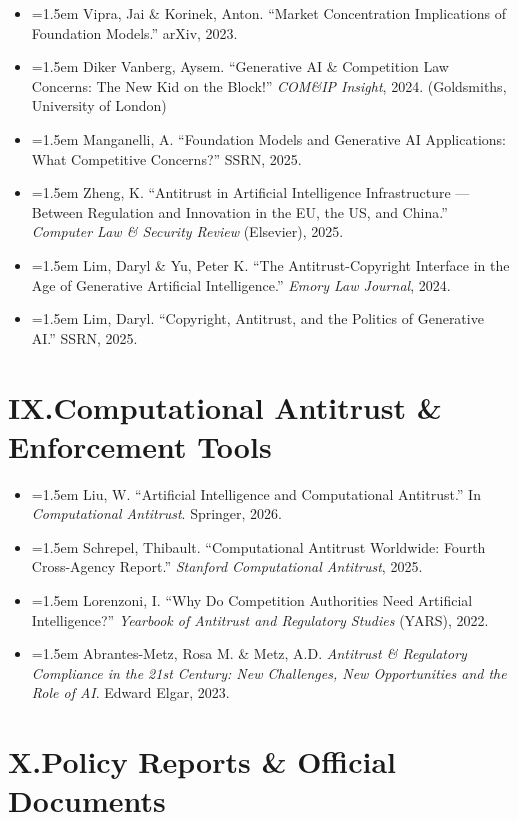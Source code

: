 \documentclass[12pt, letterpaper]{article}
\newcommand{\entry}[1]{%
  \item \hangindent=1.5em \hangafter=1 #1%
}
\begin{document}
\begin{itemize}
\entry{Vipra, Jai \& Korinek, Anton. ``Market Concentration Implications of Foundation Models.'' arXiv, 2023.}
\entry{Diker Vanberg, Aysem. ``Generative AI \& Competition Law Concerns: The New Kid on the Block!'' \textit{COM\&IP Insight}, 2024. (Goldsmiths, University of London)}
\entry{Manganelli, A. ``Foundation Models and Generative AI Applications: What Competitive Concerns?'' SSRN, 2025.}
\entry{Zheng, K. ``Antitrust in Artificial Intelligence Infrastructure --- Between Regulation and Innovation in the EU, the US, and China.'' \textit{Computer Law \& Security Review} (Elsevier), 2025.}
\entry{Lim, Daryl \& Yu, Peter K. ``The Antitrust-Copyright Interface in the Age of Generative Artificial Intelligence.'' \textit{Emory Law Journal}, 2024.}
\entry{Lim, Daryl. ``Copyright, Antitrust, and the Politics of Generative AI.'' SSRN, 2025.}
\end{itemize}

\section{IX.\quad Computational Antitrust \& Enforcement Tools}

\begin{itemize}
\entry{Liu, W. ``Artificial Intelligence and Computational Antitrust.'' In \textit{Computational Antitrust}. Springer, 2026.}
\entry{Schrepel, Thibault. ``Computational Antitrust Worldwide: Fourth Cross-Agency Report.'' \textit{Stanford Computational Antitrust}, 2025.}
\entry{Lorenzoni, I. ``Why Do Competition Authorities Need Artificial Intelligence?'' \textit{Yearbook of Antitrust and Regulatory Studies} (YARS), 2022.}
\entry{Abrantes-Metz, Rosa M. \& Metz, A.D. \textit{Antitrust \& Regulatory Compliance in the 21st Century: New Challenges, New Opportunities and the Role of AI}. Edward Elgar, 2023.}
\end{itemize}

\section{X.\quad Policy Reports \& Official Documents}
\end{document}
